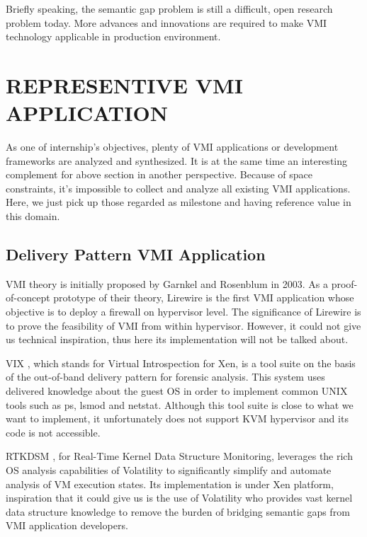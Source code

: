 Briefly speaking, the semantic gap problem is still a difficult, open research problem today. More advances and innovations are required to make
VMI technology applicable in production environment.

\section{REPRESENTIVE VMI APPLICATION}

As one of internship’s objectives, plenty of VMI applications or development frameworks are analyzed and synthesized. It is at the same time an 
interesting complement for above section in another perspective. Because of space constraints, it’s impossible to collect and analyze all 
existing VMI applications. Here, we just pick up those regarded as milestone and having reference value in this domain.

\subsection{Delivery Pattern VMI Application}

VMI theory is initially proposed by Garnkel and Rosenblum  \cite{Reference1} in 2003. As a proof-of-concept prototype of their theory, Lirewire  
\cite{Reference1} is the first VMI application whose objective is to deploy a firewall on hypervisor level. The significance of Lirewire is to 
prove the feasibility of VMI from within hypervisor. However, it could not give us technical inspiration, thus here its implementation will not 
be talked about.

VIX  \cite{Reference10}, which stands for Virtual Introspection for Xen, is a tool suite on the basis of the out-of-band delivery pattern for 
forensic analysis. This system uses delivered knowledge about the guest OS in order to implement common UNIX tools such as ps, lsmod and netstat.
Although this tool suite is close to what we want to implement, it unfortunately does not support KVM hypervisor and its code is not accessible.

RTKDSM  \cite{Reference3}, for Real-Time Kernel Data Structure Monitoring, leverages the rich OS analysis capabilities of Volatility  \cite{Reference13}
to significantly simplify and automate analysis of VM execution states. Its implementation is under Xen platform, inspiration that it could give us 
is the use of Volatility who provides vast kernel data structure knowledge to remove the burden of bridging semantic gaps from VMI application 
developers.

